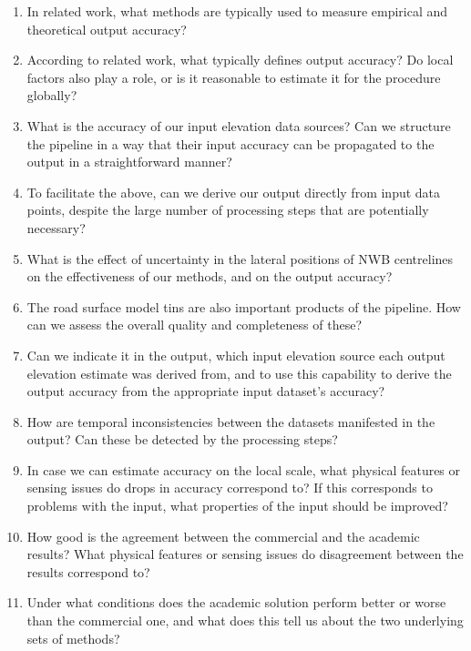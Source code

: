 \begin{enumerate}
    \begin{enumerate}
        \item In related work, what methods are typically used to measure empirical and theoretical output accuracy?
        \item According to related work, what typically defines output accuracy? Do local factors also play a role, or is it reasonable to estimate it for the procedure globally?
        \item What is the accuracy of our input elevation data sources? Can we structure the pipeline in a way that their input accuracy can be propagated to the output in a straightforward manner?
        \item To facilitate the above, can we derive our output directly from input data points, despite the large number of processing steps that are potentially necessary?
        \item What is the effect of uncertainty in the lateral positions of NWB centrelines on the effectiveness of our methods, and on the output accuracy?
        \item The road surface model \ac{tin}s are also important products of the pipeline. How can we assess the overall quality and completeness of these?
        \item Can we indicate it in the output, which input elevation source each output elevation estimate was derived from, and to use this capability to derive the output accuracy from the appropriate input dataset's accuracy?
        \item How are temporal inconsistencies between the datasets manifested in the output? Can these be detected by the processing steps?
        \item In case we can estimate accuracy on the local scale, what physical features or sensing issues do drops in accuracy correspond to? If this corresponds to problems with the input, what properties of the input should be improved?
        \item How good is the agreement between the commercial and the academic results? What physical features or sensing issues do disagreement between the results correspond to?
        \item Under what conditions does the academic solution perform better or worse than the commercial one, and what does this tell us about the two underlying sets of methods?
    \end{enumerate}
\end{enumerate}